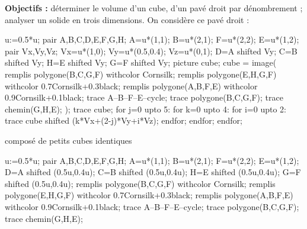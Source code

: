 \begin{changemargin}{-10mm}{-25mm}
    \begin{activite}

        {\bf Objectifs :} déterminer le volume d'un cube, d'un pavé droit par dénombrement ; analyser un solide en trois dimensions.
        On considère ce pavé droit : \quad 
        \begin{Geometrie}[CoinBG={(-u,-0.5u)},CoinHD={(5u,4u)}]
            u:=0.5*u;
            pair A,B,C,D,E,F,G,H;
            A=u*(1,1);
            B=u*(2,1);
            F=u*(2,2);
            E=u*(1,2);
            pair Vx,Vy,Vz;
            Vx=u*(1,0);
            Vy=u*(0.5,0.4);
            Vz=u*(0,1);
            D=A shifted Vy;
            C=B shifted Vy;
            H=E shifted Vy;
            G=F shifted Vy;
            picture cube;
            cube = image(
                remplis polygone(B,C,G,F) withcolor Cornsilk;
                remplis polygone(E,H,G,F) withcolor 0.7Cornsilk+0.3black;
                remplis polygone(A,B,F,E) withcolor 0.9Cornsilk+0.1black;
                trace A--B--F--E--cycle;
                trace polygone(B,C,G,F);
                trace chemin(G,H,E);
            );        
            trace cube;
            for j=0 upto 5:
                for k=0 upto 4:
                    for i=0 upto 2:
                        trace cube shifted (k*Vx+(2-j)*Vy+i*Vz);
                    endfor;
                endfor;
            endfor;
        \end{Geometrie}
        composé de petits cubes identiques \quad 
        \begin{Geometrie}
            u:=0.5*u;
            pair A,B,C,D,E,F,G,H;
            A=u*(1,1);
            B=u*(2,1);
            F=u*(2,2);
            E=u*(1,2);
            D=A shifted (0.5u,0.4u);
            C=B shifted (0.5u,0.4u);
            H=E shifted (0.5u,0.4u);
            G=F shifted (0.5u,0.4u);
            remplis polygone(B,C,G,F) withcolor Cornsilk;
            remplis polygone(E,H,G,F) withcolor 0.7Cornsilk+0.3black;
            remplis polygone(A,B,F,E) withcolor 0.9Cornsilk+0.1black;
            trace A--B--F--E--cycle;
            trace polygone(B,C,G,F);
            trace chemin(G,H,E);
        \end{Geometrie}
        \par\smallskip
        \begin{tabular}{>{\centering\arraybackslash}p{0.3\linewidth}|>{\centering\arraybackslash}p{0.3\linewidth}|>{\centering\arraybackslash}p{0.3\linewidth}}

\end{tabular}
\end{activite}
\end{changemargin}
